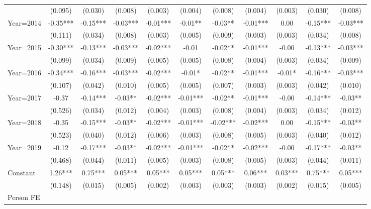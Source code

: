 {\begin{tabular}{l*{10}{c}}
                    &(0.095)   &(0.030)   &(0.008)   &(0.003)   &(0.004)   &(0.008)   &(0.004)   &(0.003)   &(0.030)   &(0.008)   \\
Year=2014           & -0.35***& -0.15***& -0.03***& -0.01***& -0.01** & -0.03** & -0.01***&  0.00   & -0.15***& -0.03***\\
                    &(0.111)   &(0.034)   &(0.008)   &(0.003)   &(0.005)   &(0.009)   &(0.003)   &(0.003)   &(0.034)   &(0.008)   \\
Year=2015           & -0.30***& -0.13***& -0.03***& -0.02***& -0.01   & -0.02** & -0.01***& -0.00   & -0.13***& -0.03***\\
                    &(0.099)   &(0.034)   &(0.009)   &(0.005)   &(0.005)   &(0.008)   &(0.004)   &(0.003)   &(0.034)   &(0.009)   \\
Year=2016           & -0.34***& -0.16***& -0.03***& -0.02***& -0.01*  & -0.02** & -0.01***& -0.01*  & -0.16***& -0.03***\\
                    &(0.107)   &(0.042)   &(0.010)   &(0.005)   &(0.005)   &(0.007)   &(0.003)   &(0.003)   &(0.042)   &(0.010)   \\
Year=2017           & -0.37   & -0.14***& -0.03** & -0.02***& -0.01***& -0.02** & -0.01***& -0.00   & -0.14***& -0.03** \\
                    &(0.526)   &(0.034)   &(0.012)   &(0.004)   &(0.003)   &(0.008)   &(0.004)   &(0.003)   &(0.034)   &(0.012)   \\
Year=2018           & -0.35   & -0.15***& -0.03** & -0.02***& -0.01***& -0.02***& -0.02***&  0.00   & -0.15***& -0.03** \\
                    &(0.523)   &(0.040)   &(0.012)   &(0.006)   &(0.003)   &(0.008)   &(0.005)   &(0.003)   &(0.040)   &(0.012)   \\
Year=2019           & -0.12   & -0.17***& -0.03** & -0.02***& -0.01***& -0.02** & -0.02***& -0.00   & -0.17***& -0.03** \\
                    &(0.468)   &(0.044)   &(0.011)   &(0.005)   &(0.003)   &(0.008)   &(0.005)   &(0.003)   &(0.044)   &(0.011)   \\
Constant            &  1.26***&  0.75***&  0.05***&  0.05***&  0.05***&  0.05***&  0.06***&  0.03***&  0.75***&  0.05***\\
                    &(0.148)   &(0.015)   &(0.005)   &(0.002)   &(0.003)   &(0.003)   &(0.003)   &(0.002)   &(0.015)   &(0.005)   \\
\hline
Person FE           &         &         &         &         &         &         &         &         &         &         \\

\end{tabular}}
